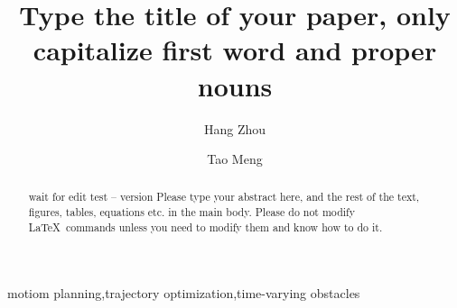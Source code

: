 \documentclass[times,authoryear]{elsarticle}
\begin{document}

\begin{frontmatter}

	\title{Type the title of your paper, only capitalize first
		word and proper nouns}%

	\author[1]{Hang Zhou}
	\author[1,2]{Tao Meng}


	\address[1]{School of Aeronautics and Astronautics, Zhejiang University, Hangzhou, 310027, China}
	\address[2]{Zhejiang Key Laboratory of Micro-nano satellite Research,  Hangzhou, 310027, China}






	\begin{abstract}
		wait for edit
		test -- version
		Please type your abstract here, and the rest of the text, figures,
		tables, equations etc. in the main body. Please do not modify LaTeX\
		commands unless you need to modify them and know how to do it.
	\end{abstract}

	\begin{keyword}
		\KWD motiom planning\sep trajectory optimization\sep time-varying obstacles
	\end{keyword}

\end{frontmatter}


\end{document}
